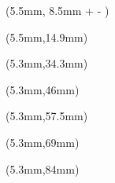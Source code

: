 \documentclass[]{article}
\begin{document}
\raggedright
\color{white}


\newlength{\originalhight}
\newlength{\originallength}
\newlength{\perfecthight}
\setlength{\perfecthight}{10pt}
\newlength{\maxlength}
\setlength{\maxlength}{40mm}
\settoheight{\originalhight}{\noindent \fontsize{10}{10} \selectfont{\MakeUppercase{\playername}}
		\ifdim \originallength > \maxlength
		\resizebox{\maxlength}{!}{\noindent \fontsize{10}{10} \selectfont{\MakeUppercase{\playername}}}
		\else
		\noindent \fontsize{10}{10} \selectfont{\MakeUppercase{\playername}}
		\fi}

\begin{textblock*}{40mm}(5.5mm, 8.5mm + \perfecthight - \originalhight)
	\settowidth{\originallength}{\noindent \fontsize{10}{10} \selectfont\textbf{\color{namecolor}\MakeUppercase{\playername}}}
	\ifdim \originallength > \maxlength
		\resizebox{\maxlength}{!}{\noindent \fontsize{10}{10} \selectfont\textbf{\color{namecolor}\MakeUppercase{\playername}}}
	\else
		\noindent \fontsize{10}{10} \selectfont\textbf{\color{namecolor}\MakeUppercase{\playername}}
	\fi
\end{textblock*}

\begin{textblock*}{30mm}(5.5mm,14.9mm)
	\noindent \fontsize{8}{8} \selectfont {\color{positioncolor}\position}
\end{textblock*}

\begin{textblock*}{13mm}(5.3mm,34.3mm)
	\noindent \fontsize{11}{11} \trebuchet {\cata}
\end{textblock*}
\begin{textblock*}{11mm}(5.3mm,46mm)
	\noindent \fontsize{11}{11} \trebuchet {\catb}
\end{textblock*}
\begin{textblock*}{10mm}(5.3mm,57.5mm)
	\noindent \fontsize{11}{11} \trebuchet {\catc}
\end{textblock*}
\begin{textblock*}{11mm}(5.3mm,69mm)
	\noindent \fontsize{11}{11} \trebuchet {\catd}
\end{textblock*}

\begin{textblock*}{12mm}(5.3mm,84mm)
	\noindent \fontsize{18}{18} \trebuchet {\#\playernumber}
\end{textblock*}
\end{document}
